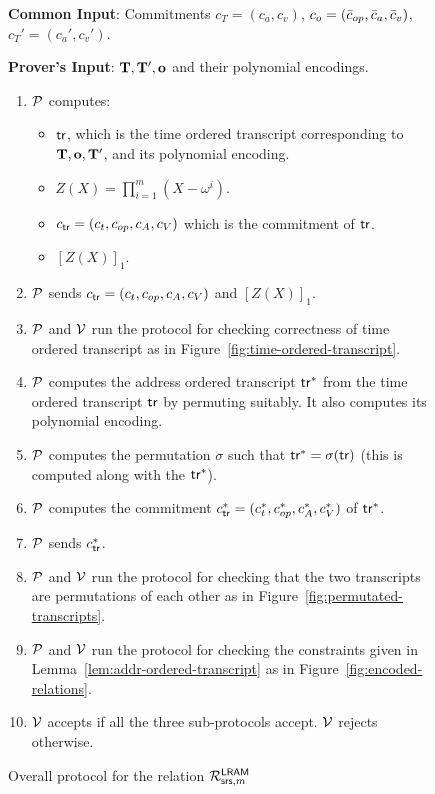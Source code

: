 \begin{figure}[htbp]

    \begin{mdframed}
    {
            {\bf Common Input}: Commitments $c_T=(c_a,c_v)$, $c_o=(\bar{c}_{op}, \bar{c}_a, \bar{c}_v)$, $c_T'=(c_a', c_v')$.

            {\bf Prover's Input}: $ \mathbf{T}, \mathbf{T}', \mathbf{o}$ and their polynomial encodings.
        \begin{enumerate}[leftmargin=1em, label=\arabic*.]
            \item $\mathcal{P}$ computes:
            \begin{itemize}
                \item $\mathsf{tr}$, which is the time ordered transcript corresponding to $\mathbf{T}, \mathbf{o}, \mathbf{T}'$, and its polynomial encoding.
                \item $Z(X)=\prod_{i=1}^m (X-\omega^i)$.
                \item $c_{\mathsf{tr}}=(c_t, c_{op}, c_A, c_V)$ which is the commitment of $\mathsf{tr}$.
                \item $[Z(X)]_1$.
            \end{itemize}

            \item $\mathcal{P}$ sends  $c_{\mathsf{tr}}=(c_t, c_{op}, c_A, c_V)$ and $[Z(X)]_1$.
            \item $\mathcal{P}$ and $\mathcal{V}$ run the protocol for checking correctness of time ordered transcript as in Figure~\ref{fig:time-ordered-transcript}.
            \item $\mathcal{P}$ computes the address ordered transcript $\mathsf{tr}^{*}$ from the time ordered transcript $\mathsf{tr}$ by permuting suitably. It also computes its polynomial encoding.
            \item $\mathcal{P}$ computes the permutation $\sigma$ such that $\mathsf{tr}^{*}= \sigma(\mathsf{tr})$ (this is computed along with the $\mathsf{tr}^{*}$).
            \item $\mathcal{P}$ computes the commitment $c_{\mathsf{tr}}^\ast=(c_t^\ast,c_{op}^\ast, c_A^\ast, c_V^\ast)$ of $\mathsf{tr}^{*}$.
            \item $\mathcal{P}$ sends  $c_{\mathsf{tr}}^\ast$.
            \item $\mathcal{P}$ and $\mathcal{V}$ run the protocol for checking that the two transcripts are permutations of each other
            as in Figure~\ref{fig:permutated-transcripts}.
            \item $\mathcal{P}$ and $\mathcal{V}$ run  the protocol for checking the constraints given in Lemma~\ref{lem:addr-ordered-transcript}
            as in Figure~\ref{fig:encoded-relations}.
            \item $\mathcal{V}$ accepts if all the three sub-protocols accept. $\mathcal{V}$ rejects otherwise.
        \end{enumerate}
    }
    \end{mdframed}
    \caption{Overall protocol for the relation $\mathcal{R}^{\mathsf{LRAM}}_{\mathsf{srs},m}$}
    \label{fig:covering-protocol}
\end{figure}

